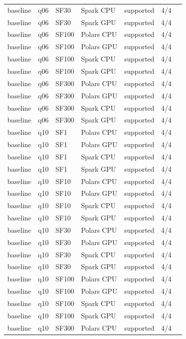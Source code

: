\begin{longtable}{lllllll}
baseline & q06 & SF30 & Spark CPU & supported & 4/4 &  \\
baseline & q06 & SF30 & Spark GPU & supported & 4/4 &  \\
baseline & q06 & SF100 & Polars CPU & supported & 4/4 &  \\
baseline & q06 & SF100 & Polars GPU & supported & 4/4 &  \\
baseline & q06 & SF100 & Spark CPU & supported & 4/4 &  \\
baseline & q06 & SF100 & Spark GPU & supported & 4/4 &  \\
baseline & q06 & SF300 & Polars CPU & supported & 4/4 &  \\
baseline & q06 & SF300 & Polars GPU & supported & 4/4 &  \\
baseline & q06 & SF300 & Spark CPU & supported & 4/4 &  \\
baseline & q06 & SF300 & Spark GPU & supported & 4/4 &  \\
baseline & q10 & SF1 & Polars CPU & supported & 4/4 &  \\
baseline & q10 & SF1 & Polars GPU & supported & 4/4 &  \\
baseline & q10 & SF1 & Spark CPU & supported & 4/4 &  \\
baseline & q10 & SF1 & Spark GPU & supported & 4/4 &  \\
baseline & q10 & SF10 & Polars CPU & supported & 4/4 &  \\
baseline & q10 & SF10 & Polars GPU & supported & 4/4 &  \\
baseline & q10 & SF10 & Spark CPU & supported & 4/4 &  \\
baseline & q10 & SF10 & Spark GPU & supported & 4/4 &  \\
baseline & q10 & SF30 & Polars CPU & supported & 4/4 &  \\
baseline & q10 & SF30 & Polars GPU & supported & 4/4 &  \\
baseline & q10 & SF30 & Spark CPU & supported & 4/4 &  \\
baseline & q10 & SF30 & Spark GPU & supported & 4/4 &  \\
baseline & q10 & SF100 & Polars CPU & supported & 4/4 &  \\
baseline & q10 & SF100 & Polars GPU & supported & 4/4 &  \\
baseline & q10 & SF100 & Spark CPU & supported & 4/4 &  \\
baseline & q10 & SF100 & Spark GPU & supported & 4/4 &  \\
baseline & q10 & SF300 & Polars CPU & supported & 4/4 &  \\

\end{longtable}
